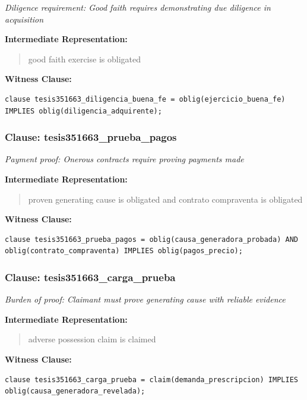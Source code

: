 \documentclass[11pt,a4paper]{article}
\begin{document}
\textit{Diligence requirement: Good faith requires demonstrating due diligence in acquisition}

\textbf{Intermediate Representation:}

\begin{quote}
good faith exercise is obligated
\end{quote}

\textbf{Witness Clause:}

\begin{lstlisting}[style=witnessstyle, language=Witness]
clause tesis351663_diligencia_buena_fe = oblig(ejercicio_buena_fe) IMPLIES oblig(diligencia_adquirente);
\end{lstlisting}

\subsubsection{Clause: tesis351663\_prueba\_pagos}

\textit{Payment proof: Onerous contracts require proving payments made}

\textbf{Intermediate Representation:}

\begin{quote}
proven generating cause is obligated and contrato compraventa is obligated
\end{quote}

\textbf{Witness Clause:}

\begin{lstlisting}[style=witnessstyle, language=Witness]
clause tesis351663_prueba_pagos = oblig(causa_generadora_probada) AND oblig(contrato_compraventa) IMPLIES oblig(pagos_precio);
\end{lstlisting}

\subsubsection{Clause: tesis351663\_carga\_prueba}

\textit{Burden of proof: Claimant must prove generating cause with reliable evidence}

\textbf{Intermediate Representation:}

\begin{quote}
adverse possession claim is claimed
\end{quote}

\textbf{Witness Clause:}

\begin{lstlisting}[style=witnessstyle, language=Witness]
clause tesis351663_carga_prueba = claim(demanda_prescripcion) IMPLIES oblig(causa_generadora_revelada);
\end{lstlisting}
\end{document}
